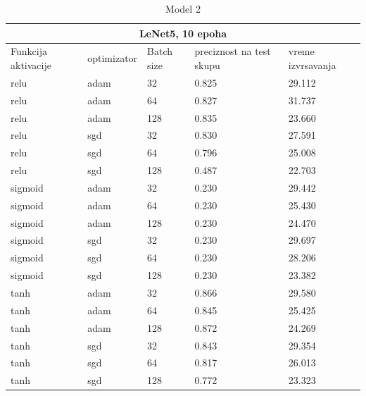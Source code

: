 \documentclass[a4paper]{article}
\begin{document}
\begin{table}[h!]
\begin{center}
\caption{Model 2}
\begin{tabular}{ |p{1.5cm}||p{2cm}|p{1cm}|p{1.5cm}|p{1.5cm}| }
 \hline
 \multicolumn{5}{|c|}{LeNet5, 10 epoha} \\
 \hline
 Funkcija aktivacije & optimizator & Batch size & preciznost na test skupu & vreme izvrsavanja\\
 \hline
 relu    & adam & 32  & 0.825  & 29.112  \\
 relu    & adam & 64  & 0.827  & 31.737  \\
 relu    & adam & 128 & 0.835  & 23.660  \\
 relu    & sgd  & 32  & 0.830  & 27.591  \\
 relu    & sgd  & 64  & 0.796  & 25.008  \\
 relu    & sgd  & 128 & 0.487  & 22.703  \\
 sigmoid & adam & 32  & 0.230  & 29.442  \\
 sigmoid & adam & 64  & 0.230  & 25.430  \\
 sigmoid & adam & 128 & 0.230  & 24.470  \\
 sigmoid & sgd  & 32  & 0.230  & 29.697  \\
 sigmoid & sgd  & 64  & 0.230  & 28.206  \\
 sigmoid & sgd  & 128 & 0.230  & 23.382  \\
 tanh    & adam & 32  & 0.866  & 29.580 \\
 tanh    & adam & 64  & 0.845  & 25.425  \\
 tanh    & adam & 128 & 0.872  & 24.269  \\
 tanh    & sgd  & 32  & 0.843  & 29.354  \\
 tanh    & sgd  & 64  & 0.817  & 26.013  \\
 tanh    & sgd  & 128 & 0.772  & 23.323  \\

 \hline
\end{tabular}
\label{tabela_model2_1}
\end{center}
\end{table}
\end{document}
